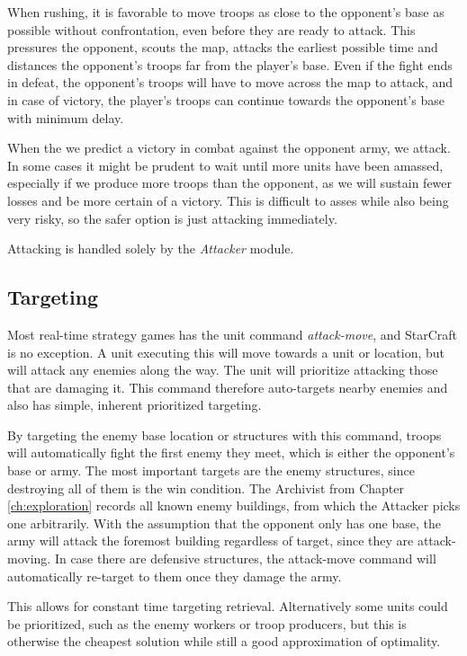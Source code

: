 When rushing, it is favorable to move troops as close to the opponent's base as possible without confrontation, even before they are ready to attack. This pressures the opponent, scouts the map, attacks the earliest possible time and distances the opponent's troops far from the player's base. Even if the fight ends in defeat, the opponent's troops will have to move across the map to attack, and in case of victory, the player's troops can continue towards the opponent's base with minimum delay.

When the we predict a victory in combat against the opponent army, we attack. In some cases it might be prudent to wait until more units have been amassed, especially if we produce more troops than the opponent, as we will sustain fewer losses and be more certain of a victory. This is difficult to asses while also being very risky, so the safer option is just attacking immediately.


Attacking is handled solely by the \emph{Attacker} module.

	\subsection*{Targeting}
	Most real-time strategy games has the unit command \emph{attack-move}, and StarCraft is no exception. A unit executing this will move towards a unit or location, but will attack any enemies along the way. The unit will prioritize attacking those that are damaging it. This command therefore auto-targets nearby enemies and also has simple, inherent prioritized targeting.
	
	By targeting the enemy base location or structures with this command, troops will automatically fight the first enemy they meet, which is either the opponent's base or army. The most important targets are the enemy structures, since destroying all of them is the win condition. The Archivist from Chapter \ref{ch:exploration} records all known enemy buildings, from which the Attacker picks one arbitrarily. With the assumption that the opponent only has one base, the army will attack the foremost building regardless of target, since they are attack-moving. In case there are defensive structures, the attack-move command will automatically re-target to them once they damage the army.
	
	This allows for constant time targeting retrieval. Alternatively some units could be prioritized, such as the enemy workers or troop producers, but this is otherwise the cheapest solution while still a good approximation of optimality.
	
